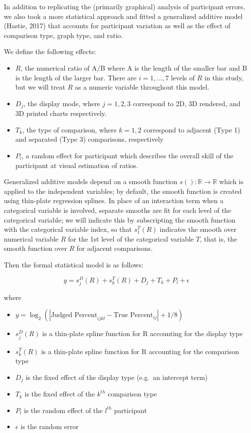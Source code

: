 \documentclass[phd]{nuthesis}
\begin{document}
In addition to replicating the (primarily graphical) analysis of
participant errors, we also took a more statistical approach and fitted
a generalized additive model (Hastie, 2017) that accounts for
participant variation as well as the effect of comparison type, graph
type, and ratio.

We define the following effects:

\begin{itemize}
\item
  \(R\), the numerical ratio of A/B where A is the length of the smaller
  bar and B is the length of the larger bar. There are \(i=1, ..., 7\)
  levels of \(R\) in this study, but we will treat \(R\) as a numeric
  variable throughout this model.
\item
  \(D_j\), the display mode, where \(j = 1, 2, 3\) correspond to 2D, 3D
  rendered, and 3D printed charts respectively.
\item
  \(T_k\), the type of comparison, where \(k = 1, 2\) correspond to
  adjacent (Type 1) and separated (Type 3) comparisons, respectively
\item
  \(P_l\), a random effect for participant which describes the overall
  skill of the participant at visual estimation of ratios.
\end{itemize}

Generalized additive models depend on a smooth function
\(s(): \mathbb{R}\rightarrow\mathbb{R}\) which is applied to the
independent variables; by default, the smooth function is created using
thin-plate regression splines. In place of an interaction term when a
categorical variable is involved, separate smooths are fit for each
level of the categorical variable; we will indicate this by subscripting
the smooth function with the categorical variable index, so that
\(s^T_1(R)\) indicates the smooth over numerical variable \(R\) for the
1st level of the categorical variable \(T\), that is, the smooth
function over \(R\) for adjacent comparisons.

Then the formal statistical model is as follows:

\[y= s^D_j(R) + s^T_k(R) + D_j + T_k + P_l + \epsilon\]

\noindent where

\begin{itemize}
\item
  \(y=\log_2(|\text{Judged Percent}_{ijkl} - \text{True Percent}_{ij}|+1/8)\)
\item
  \(s^D_j(R)\) is a thin-plate spline function for R accounting for the
  display type
\item
  \(s^T_k(R)\) is a thin-plate spline function for R accounting for the
  comparison type
\item
  \(D_j\) is the fixed effect of the display type (e.g.~an intercept
  term)
\item
  \(T_k\) is the fixed effect of the \(k^{th}\) comparison type
\item
  \(P_l\) is the random effect of the \(l^{th}\) participant
\item
  \(\epsilon\) is the random error
\end{itemize}
\end{document}
